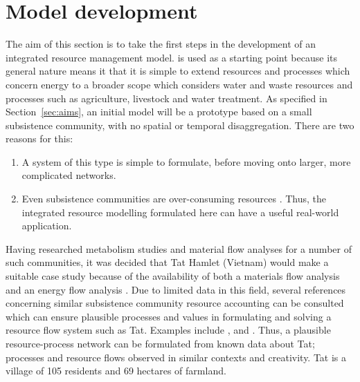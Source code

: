 \section{Model development} \label{sec:models}
The aim of this section is to take the first steps in the development of an integrated resource management model. \citet{Samsatli} is used as a starting point because its general nature means it that it is simple to extend resources and processes which concern energy to a broader scope which considers water and waste resources and processes such as agriculture, livestock and water treatment. As specified in Section~\ref{sec:aims}, an initial model will be a prototype based on a small subsistence community, with no spatial or temporal disaggregation. There are two reasons for this: 
\begin{enumerate}
	\item A system of this type is simple to formulate, before moving onto larger, more complicated networks.
	\item Even subsistence communities are over-consuming resources \citep{Hobbes2005, Hobbes2007, Shandl2006, Haberl2002}. Thus, the integrated resource modelling formulated here can have a useful real-world application.
\end{enumerate}

Having researched metabolism studies and material flow analyses for a number of such communities, it was decided that Tat Hamlet (Vietnam) would make a suitable case study because of the availability of both a materials flow analysis \citep{Hobbes2007, Shandl2006} and an energy flow analysis \citep{Heezen2003}. Due to limited data in this field, several references concerning similar subsistence community resource accounting can be consulted which can ensure plausible processes and values in formulating and solving a resource flow system such as Tat. Examples include \citet{Alam1997}, \citet{Alam1999} and \citep{Tripathi2001}. Thus, a plausible resource-process network can be formulated from known data about Tat; processes and resource flows observed in similar contexts and creativity. Tat is a village of 105 residents and 69 hectares of farmland.

